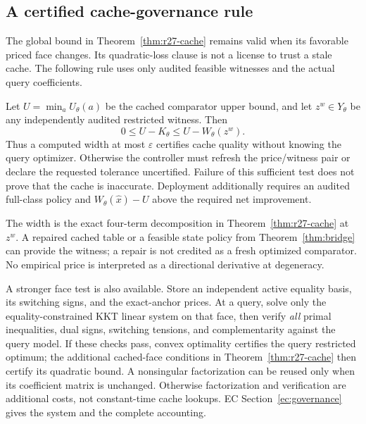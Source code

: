 \subsection{A certified cache-governance rule}\label{sec:governance}
The global bound in Theorem~\ref{thm:r27-cache} remains valid when its favorable priced face changes. Its quadratic-loss clause is not a license to trust a stale cache. The following rule uses only audited feasible witnesses and the actual query coefficients.
\begin{proposition}\label{prop:governance}
Let $U=\min_aU_\theta(a)$ be the cached comparator upper bound, and let $z^w\in Y_\theta$ be any independently audited restricted witness. Then
\[
 0\leq U-K_\theta\leq U-W_\theta(z^w).
\]
Thus a computed width at most $\varepsilon$ certifies cache quality without knowing the query optimizer. Otherwise the controller must refresh the price/witness pair or declare the requested tolerance uncertified. Failure of this sufficient test does not prove that the cache is inaccurate. Deployment additionally requires an audited full-class policy and $W_\theta(\widehat x)-U$ above the required net improvement.
\end{proposition}
The width is the exact four-term decomposition in Theorem~\ref{thm:r27-cache} at $z^w$. A repaired cached table or a feasible state policy from Theorem~\ref{thm:bridge} can provide the witness; a repair is not credited as a fresh optimized comparator. No empirical price is interpreted as a directional derivative at degeneracy.

A stronger face test is also available. Store an independent active equality basis, its switching signs, and the exact-anchor prices. At a query, solve only the equality-constrained KKT linear system on that face, then verify \emph{all} primal inequalities, dual signs, switching tensions, and complementarity against the query model. If these checks pass, convex optimality certifies the query restricted optimum; the additional cached-face conditions in Theorem~\ref{thm:r27-cache} then certify its quadratic bound. A nonsingular factorization can be reused only when its coefficient matrix is unchanged. Otherwise factorization and verification are additional costs, not constant-time cache lookups. EC Section~\ref{ec:governance} gives the system and the complete accounting.

